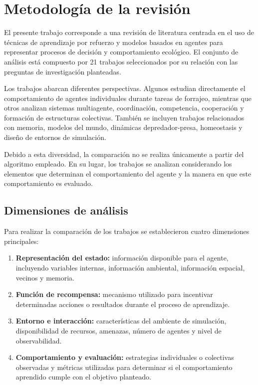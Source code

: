 \documentclass[conference]{IEEEtran}
\begin{document}

\section{Metodología de la revisión}

El presente trabajo corresponde a una revisión de literatura centrada en
el uso de técnicas de aprendizaje por refuerzo y modelos basados en
agentes para representar procesos de decisión y comportamiento ecológico.
El conjunto de análisis está compuesto por 21 trabajos seleccionados por
su relación con las preguntas de investigación planteadas.

Los trabajos abarcan diferentes perspectivas. Algunos estudian
directamente el comportamiento de agentes individuales durante tareas de
forrajeo, mientras que otros analizan sistemas multiagente, coordinación,
competencia, cooperación y formación de estructuras colectivas. También
se incluyen trabajos relacionados con memoria, modelos del mundo,
dinámicas depredador-presa, homeostasis y diseño de entornos de
simulación.

Debido a esta diversidad, la comparación no se realiza únicamente a
partir del algoritmo empleado. En su lugar, los trabajos se analizan
considerando los elementos que determinan el comportamiento del agente y
la manera en que este comportamiento es evaluado.

\subsection{Dimensiones de análisis}

Para realizar la comparación de los trabajos se establecieron cuatro
dimensiones principales:

\begin{enumerate}

    \item \textbf{Representación del estado:} información disponible para
    el agente, incluyendo variables internas, información ambiental,
    información espacial, vecinos y memoria.

    \item \textbf{Función de recompensa:} mecanismo utilizado para
    incentivar determinadas acciones o resultados durante el proceso de
    aprendizaje.

    \item \textbf{Entorno e interacción:} características del ambiente de
    simulación, disponibilidad de recursos, amenazas, número de agentes
    y nivel de observabilidad.

    \item \textbf{Comportamiento y evaluación:} estrategias individuales
    o colectivas observadas y métricas utilizadas para determinar si el
    comportamiento aprendido cumple con el objetivo planteado.

\end{enumerate}
\end{document}
